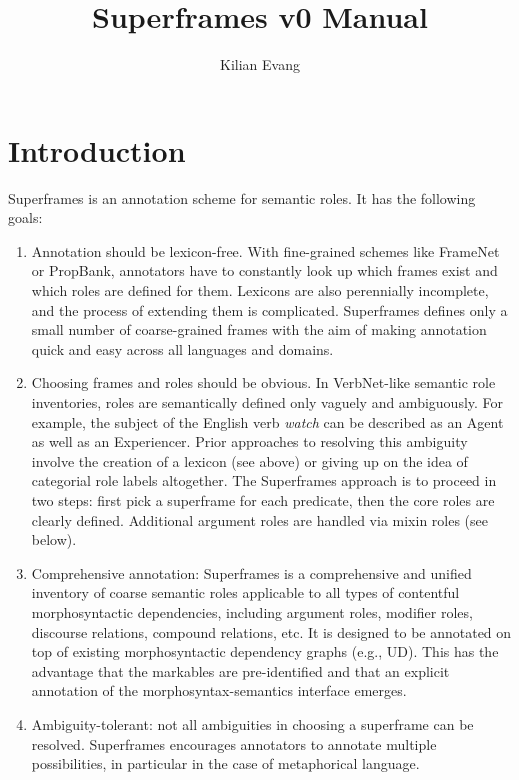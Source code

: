 \documentclass[a4paper]{article}
\title{Superframes v0 Manual}
\author{Kilian Evang}
\begin{document}
\maketitle

\tableofcontents

\section{Introduction}

Superframes is an annotation scheme for semantic roles. It has the following goals:

\begin{enumerate}
    \item Annotation should be lexicon-free. With fine-grained schemes like FrameNet or PropBank, annotators have to constantly look up which frames exist and which roles are defined for them. Lexicons are also perennially incomplete, and the process of extending them is complicated. Superframes defines only a small number of coarse-grained frames with the aim of making annotation quick and easy across all languages and domains.
    \item Choosing frames and roles should be obvious. In VerbNet-like semantic role inventories, roles are semantically defined only vaguely and ambiguously. For example, the subject of the English verb \emph{watch} can be described as an Agent as well as an Experiencer. Prior approaches to resolving this ambiguity involve the creation of a lexicon (see above) or giving up on the idea of categorial role labels altogether. The Superframes approach is to proceed in two steps: first pick a superframe for each predicate, then the core roles are clearly defined. Additional argument roles are handled via mixin roles (see below).
    \item Comprehensive annotation: Superframes is a comprehensive and unified inventory of coarse semantic roles applicable to all types of contentful morphosyntactic dependencies, including argument roles, modifier roles, discourse relations, compound relations, etc. It is designed to be annotated on top of existing morphosyntactic dependency graphs (e.g., UD). This has the advantage that the markables are pre-identified and that an explicit annotation of the morphosyntax-semantics interface emerges.
    \item Ambiguity-tolerant: not all ambiguities in choosing a superframe can be resolved. Superframes encourages annotators to annotate multiple possibilities, in particular in the case of metaphorical language.
\end{enumerate}
\end{document}
